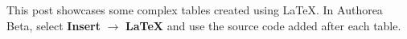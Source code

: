 This post showcases some complex tables created using LaTeX. In Authorea Beta, select \textbf{Insert} $\rightarrow$ \textbf{LaTeX} and use the source code added after each table.

\newline